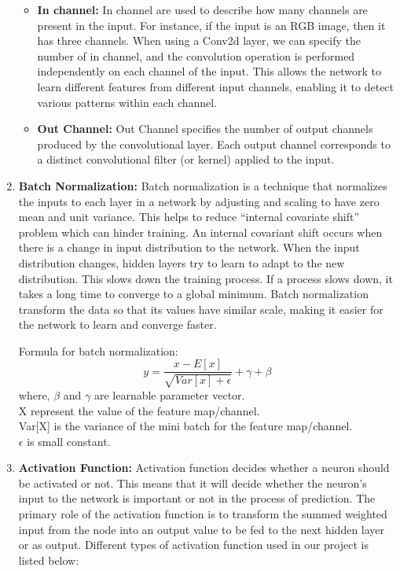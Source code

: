 \begin{enumerate}
\begin{itemize}
            \item {\bf In channel:} In channel are used to describe how many channels are present in the input. For instance, if the input is an RGB image, then it has three channels. When using a Conv2d layer, we can specify the number of in channel, and the convolution operation is performed independently on each channel of the input. This allows the network to learn different features from different input channels, enabling it to detect various patterns within each channel.
            \item {\bf Out Channel:} Out Channel specifies the number of output channels produced by the convolutional layer. Each output channel corresponds to a distinct convolutional filter (or kernel) applied to the input.
        \end{itemize}
        \item {\bf Batch Normalization:} Batch normalization is a technique that normalizes the inputs to each layer in a network by adjusting and scaling to have zero mean and unit variance. This helps to reduce “internal covariate shift” problem which can hinder training. An internal covariant shift occurs when there is a change in input distribution to the network. When the input distribution changes, hidden layers try to learn to adapt to the new distribution. This slows down the training process. If a process slows down, it takes a long time to converge to a global minimum. Batch normalization transform the data so that its values have similar scale, making it easier for the network to learn and converge faster. \par
        Formula for batch normalization:
        $$y = \frac{x - E [x]}{\sqrt{Var[x] + \epsilon }}+\gamma + \beta $$
        where, $\beta$ and $\gamma$ are learnable parameter vector. \\ 
        X represent the value of the feature map/channel.\\
        Var[X] is the variance of the mini batch for the feature map/channel.\\
        $\epsilon$ is small constant.\\
        \item {\bf Activation Function:} Activation function decides whether a neuron should be activated or not. This means that it will decide whether the neuron’s input to the network is important or not in the process of prediction. The primary role of the activation function is to transform the summed weighted input from the node into an output value to be fed to the next hidden layer or as output. Different types of activation function used in our project is listed below:

\end{enumerate}
